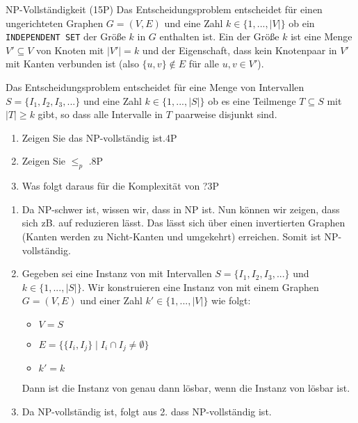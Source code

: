\documentclass{article}
\begin{document}
\begin{exercise}{NP-Vollständigkeit (15P)}
  Das Entscheidungsproblem  entscheidet für einen ungerichteten Graphen $G = (V,E)$ und eine Zahl $k \in \{1,...,|V|\}$ ob ein \texttt{INDEPENDENT SET} der Größe $k$ in $G$ enthalten ist. Ein  der Größe $k$ ist eine Menge $V' \subseteq V$ von Knoten mit $|V'| = k$ und der Eigenschaft, dass kein Knotenpaar in $V'$ mit Kanten verbunden ist (also $\{u, v\} \not\in E$ für alle $u, v \in V'$).\par
  Das Entscheidungsproblem  entscheidet für eine Menge von Intervallen $S = \{I_1,I_2,I_3,...\}$ und eine Zahl $k \in \{1,...,|S|\}$ ob es eine Teilmenge $T \subseteq S$ mit $|T| \geq k$ gibt, so dass alle Intervalle in $T$ paarweise disjunkt sind.
  \begin{enumerate}
    \item Zeigen Sie das  NP-vollständig ist.\hfill 4P
    \item Zeigen Sie  $\leq_p$ .\hfill 8P
    \item Was folgt daraus für die Komplexität von ?\hfill 3P
  \end{enumerate}
  \begin{solution}
    \begin{enumerate}
      \item Da  NP-schwer ist, wissen wir, dass  in NP ist. Nun können wir zeigen, dass sich  zB. auf  reduzieren lässt. Das lässt sich über einen invertierten Graphen (Kanten werden zu Nicht-Kanten und umgekehrt) erreichen. Somit ist  NP-vollständig.
      \item Gegeben sei eine Instanz von  mit Intervallen $S = \{I_1,I_2,I_3,...\}$ und $k \in \{1,...,|S|\}$. Wir konstruieren eine Instanz von  mit einem Graphen $G = (V,E)$ und einer Zahl $k' \in \{1,...,|V|\}$ wie folgt:
            \begin{itemize}
              \item $V = S$
              \item $E = \{\{I_i,I_j\} \mid I_i \cap I_j \neq \emptyset\}$
              \item $k' = k$
            \end{itemize}
            Dann ist die Instanz von  genau dann lösbar, wenn die Instanz von  lösbar ist.
      \item Da  NP-vollständig ist, folgt aus 2. dass  NP-vollständig ist.
    \end{enumerate}
  \end{solution}
\end{exercise}
\end{document}
